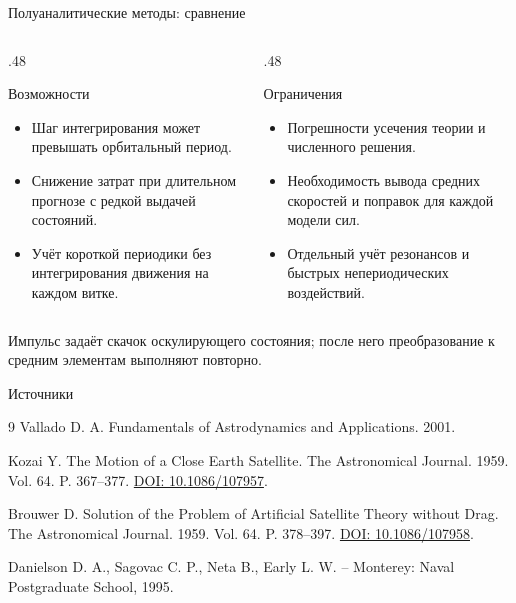 \documentclass[11pt,aspectratio=169,t]{beamer}
\begin{document}
\begin{frame}{Полуаналитические методы: сравнение}
\vspace{-1.5mm}
\begin{columns}[T,onlytextwidth]
\begin{column}{.48\textwidth}
\begin{block}{Возможности}
\begin{itemize}\setlength{\itemsep}{1.5pt}
\item Шаг интегрирования может превышать орбитальный период.
\item Снижение затрат при длительном прогнозе с редкой выдачей состояний.
\item Учёт короткой периодики без интегрирования движения на каждом витке.
\end{itemize}
\end{block}
\end{column}
\begin{column}{.48\textwidth}
\begin{block}{Ограничения}
\begin{itemize}\setlength{\itemsep}{1.5pt}
\item Погрешности усечения теории и численного решения.
\item Необходимость вывода средних скоростей и поправок для каждой модели сил.
\item Отдельный учёт резонансов и быстрых непериодических воздействий.
\end{itemize}
\end{block}
\end{column}
\end{columns}
\smallskip
\justifying
Импульс задаёт скачок оскулирующего состояния; после него преобразование к средним элементам выполняют повторно.
\end{frame}

\begin{frame}{Источники}
\begin{thebibliography}{9}
Vallado D. A. Fundamentals of Astrodynamics and Applications. 2001.

Kozai Y. The Motion of a Close Earth Satellite. The Astronomical Journal. 1959. Vol. 64. P. 367--377. \href{https://doi.org/10.1086/107957}{DOI: 10.1086/107957}.

Brouwer D. Solution of the Problem of Artificial Satellite Theory without Drag. The Astronomical Journal. 1959. Vol. 64. P. 378--397. \href{https://doi.org/10.1086/107958}{DOI: 10.1086/107958}.

Danielson D. A., Sagovac C. P., Neta B., Early L. W. – Monterey: Naval Postgraduate School, 1995.
\end{thebibliography}
\end{frame}
\end{document}

